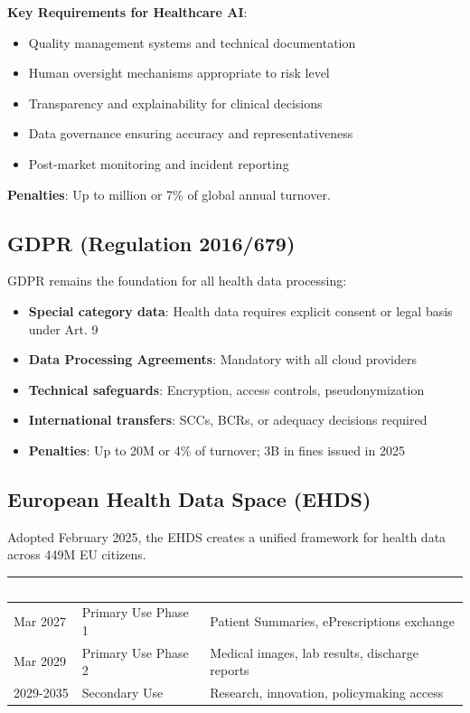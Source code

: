 \documentclass[11pt,a4paper]{article}
\begin{document}
\textbf{Key Requirements for Healthcare AI}:
\begin{itemize}
    \item Quality management systems and technical documentation
    \item Human oversight mechanisms appropriate to risk level
    \item Transparency and explainability for clinical decisions
    \item Data governance ensuring accuracy and representativeness
    \item Post-market monitoring and incident reporting
\end{itemize}

\textbf{Penalties}: Up to  million or 7\% of global annual turnover.

\subsection{GDPR (Regulation 2016/679)}

GDPR remains the foundation for all health data processing:

\begin{itemize}
    \item \textbf{Special category data}: Health data requires explicit consent or legal basis under Art. 9
    \item \textbf{Data Processing Agreements}: Mandatory with all cloud providers
    \item \textbf{Technical safeguards}: Encryption, access controls, pseudonymization
    \item \textbf{International transfers}: SCCs, BCRs, or adequacy decisions required
    \item \textbf{Penalties}: Up to \texteuro20M or 4\% of turnover; \texteuro3B in fines issued in 2025
\end{itemize}

\subsection{European Health Data Space (EHDS)}

Adopted February 2025, the EHDS creates a unified framework for health data across 449M EU citizens.

\begin{center}
\begin{tabular}{L{2.5cm}L{4cm}L{6.5cm}}
\toprule
{}
\textcolor{white}{\textbf{Timeline}} & \textcolor{white}{\textbf{Scope}} & \textcolor{white}{\textbf{Requirements}} \\
\midrule
Mar 2027 & Primary Use Phase 1 & Patient Summaries, ePrescriptions exchange \\
Mar 2029 & Primary Use Phase 2 & Medical images, lab results, discharge reports \\
2029-2035 & Secondary Use & Research, innovation, policymaking access \\
\bottomrule
\end{tabular}
\end{center}
\end{document}

